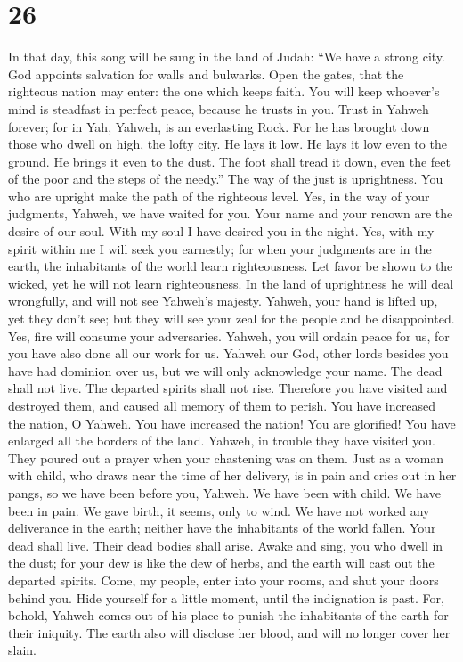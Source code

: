 \hypertarget{section-25}{%
\section{26}\label{section-25}}

 In that day, this song will be sung in the land of Judah:
``We have a strong city. God appoints salvation for walls and bulwarks.
 Open the gates, that the righteous nation may enter: the
one which keeps faith.  You will keep whoever's mind is
steadfast in perfect peace, because he trusts in you. 
Trust in Yahweh forever; for in Yah, Yahweh, is an everlasting Rock.
 For he has brought down those who dwell on high, the
lofty city. He lays it low. He lays it low even to the ground. He brings
it even to the dust.  The foot shall tread it down, even
the feet of the poor and the steps of the needy.''  The
way of the just is uprightness. You who are upright make the path of the
righteous level.  Yes, in the way of your judgments,
Yahweh, we have waited for you. Your name and your renown are the desire
of our soul.  With my soul I have desired you in the
night. Yes, with my spirit within me I will seek you earnestly; for when
your judgments are in the earth, the inhabitants of the world learn
righteousness.  Let favor be shown to the wicked, yet he
will not learn righteousness. In the land of uprightness he will deal
wrongfully, and will not see Yahweh's majesty.  Yahweh,
your hand is lifted up, yet they don't see; but they will see your zeal
for the people and be disappointed. Yes, fire will consume your
adversaries.  Yahweh, you will ordain peace for us, for
you have also done all our work for us.  Yahweh our God,
other lords besides you have had dominion over us, but we will only
acknowledge your name.  The dead shall not live. The
departed spirits shall not rise. Therefore you have visited and
destroyed them, and caused all memory of them to perish. 
You have increased the nation, O Yahweh. You have increased the nation!
You are glorified! You have enlarged all the borders of the land.
 Yahweh, in trouble they have visited you. They poured
out a prayer when your chastening was on them.  Just as a
woman with child, who draws near the time of her delivery, is in pain
and cries out in her pangs, so we have been before you, Yahweh.
 We have been with child. We have been in pain. We gave
birth, it seems, only to wind. We have not worked any deliverance in the
earth; neither have the inhabitants of the world fallen. 
Your dead shall live. Their dead bodies shall arise. Awake and sing, you
who dwell in the dust; for your dew is like the dew of herbs, and the
earth will cast out the departed spirits.  Come, my
people, enter into your rooms, and shut your doors behind you. Hide
yourself for a little moment, until the indignation is past.
 For, behold, Yahweh comes out of his place to punish the
inhabitants of the earth for their iniquity. The earth also will
disclose her blood, and will no longer cover her slain.

